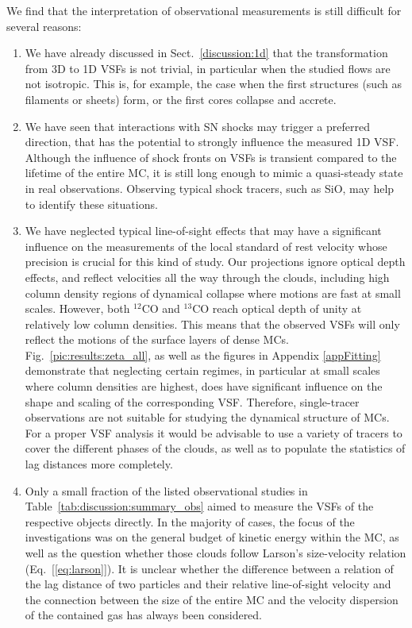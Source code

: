 We find that the interpretation of observational measurements is still difficult for several reasons:
\begin{enumerate}
\item We have already discussed in Sect.~\ref{discussion:1d} that the transformation from 3D to 1D VSFs is not trivial, in particular when the studied flows are not isotropic.
This is, for example, the case when the first structures (such as filaments or sheets) form, or the first cores collapse and accrete.
\item We have seen that interactions with SN shocks may trigger a preferred direction, that has the potential to strongly influence the measured 1D VSF.
Although the influence of shock fronts on VSFs is transient compared to the lifetime of the entire MC, it is still long enough to mimic a quasi-steady state in real observations.
Observing typical shock tracers, such as SiO, may help to identify these situations. 
\item We have neglected typical line-of-sight effects that may have a significant influence on the measurements of the local standard of rest velocity whose precision is crucial for this kind of study.
Our projections ignore optical depth effects, and reflect velocities all the way through the clouds, including high column density regions of dynamical collapse where motions are fast at small scales.
However, both $^{12}$CO and $^{13}$CO reach optical depth of unity at relatively low column densities. 
This means that the observed VSFs will only reflect the motions of the surface layers of dense MCs.  
Fig.~\ref{pic:results:zeta_all}, as well as the figures in Appendix \ref{appFitting} demonstrate that neglecting certain regimes, in particular at small scales where column densities are highest, does have significant influence on the shape and scaling of the corresponding VSF.
Therefore, single-tracer observations are not suitable for studying the dynamical structure of MCs. 
For a proper VSF analysis it would be advisable to use a variety of tracers to cover the different phases of the clouds, as well as to populate the statistics of lag distances more completely.
\item Only a small fraction of the listed observational studies in Table~\ref{tab:discussion:summary_obs} aimed to measure the VSFs of the respective objects directly.
In the majority of cases, the focus of the investigations was on the general budget of kinetic energy within the MC, as well as the question whether those clouds follow Larson's size-velocity relation (Eq.~[\ref{eq:larson}]).
It is unclear whether the difference between a relation of the lag distance of two particles and their relative line-of-sight velocity and the connection between the size of the entire MC and the velocity dispersion of the contained gas has always been considered.
\end{enumerate}


